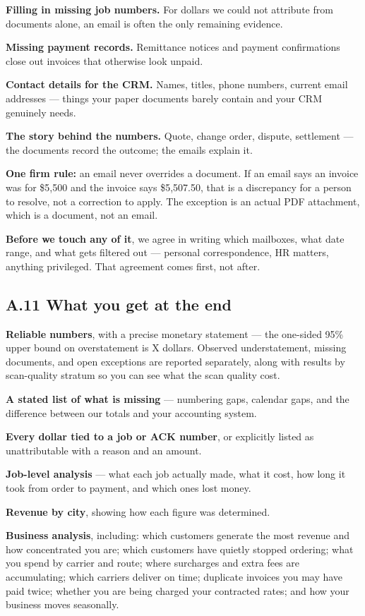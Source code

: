 \documentclass[
]{article}
\begin{document}
\textbf{Filling in missing job numbers.} For dollars we could not
attribute from documents alone, an email is often the only remaining
evidence.

\textbf{Missing payment records.} Remittance notices and payment
confirmations close out invoices that otherwise look unpaid.

\textbf{Contact details for the CRM.} Names, titles, phone numbers,
current email addresses --- things your paper documents barely contain
and your CRM genuinely needs.

\textbf{The story behind the numbers.} Quote, change order, dispute,
settlement --- the documents record the outcome; the emails explain it.

\textbf{One firm rule:} an email never overrides a document. If an email
says an invoice was for \$5,500 and the invoice says \$5,507.50, that is
a discrepancy for a person to resolve, not a correction to apply. The
exception is an actual PDF attachment, which is a document, not an
email.

\textbf{Before we touch any of it}, we agree in writing which mailboxes,
what date range, and what gets filtered out --- personal correspondence,
HR matters, anything privileged. That agreement comes first, not after.

\subsection{A.11 What you get at the
end}\label{a.11-what-you-get-at-the-end}

\textbf{Reliable numbers}, with a precise monetary statement --- the
one-sided 95\% upper bound on overstatement is X dollars. Observed
understatement, missing documents, and open exceptions are reported
separately, along with results by scan-quality stratum so you can see
what the scan quality cost.

\textbf{A stated list of what is missing} --- numbering gaps, calendar
gaps, and the difference between our totals and your accounting system.

\textbf{Every dollar tied to a job or ACK number}, or explicitly listed
as unattributable with a reason and an amount.

\textbf{Job-level analysis} --- what each job actually made, what it
cost, how long it took from order to payment, and which ones lost money.

\textbf{Revenue by city}, showing how each figure was determined.

\textbf{Business analysis}, including: which customers generate the most
revenue and how concentrated you are; which customers have quietly
stopped ordering; what you spend by carrier and route; where surcharges
and extra fees are accumulating; which carriers deliver on time;
duplicate invoices you may have paid twice; whether you are being
charged your contracted rates; and how your business moves seasonally.
\end{document}
